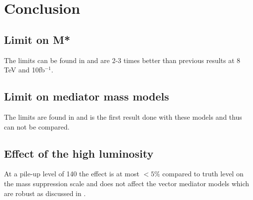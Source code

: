 \newpage
\section{Conclusion}
\subsection{Limit on M*}
The limits can be found in  and are 2-3 times better than previous results at 8 TeV and 10fb$^{-1}$.

\subsection{Limit on mediator mass models}
The limits are found in  and is the first result done with these models and thus can not be compared.

\subsection{Effect of the high luminosity}
At a pile-up level of 140 the effect is at most $<5\%$ compared to truth level on the mass suppression scale and does not affect the vector mediator models which are robust as discussed in .